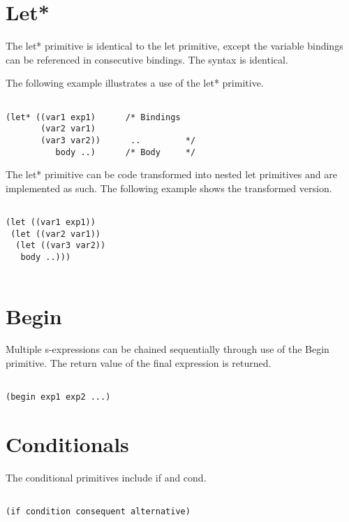 \documentclass{article}
\begin{document}
\section{Let*}

The let* primitive is identical to the let primitive, except the variable bindings can be referenced in consecutive bindings. The syntax is identical.

The following example illustrates a use of the let* primitive. 

\begin{verbatim}

(let* ((var1 exp1)      /* Bindings
       (var2 var1)     
       (var3 var2))      ..         */
          body ..)      /* Body     */   

\end{verbatim}

The let* primitive can be code transformed into nested let primitives and are implemented as such. The following example shows the transformed version.

\begin{verbatim}

(let ((var1 exp1))
 (let ((var2 var1))
  (let ((var3 var2))
   body ..))) 
 
\end{verbatim}

\section{Begin}

Multiple s-expressions can be chained sequentially through use of the Begin primitive. The return value of the final expression is returned. 

\begin{verbatim}

(begin exp1 exp2 ...) 

\end{verbatim}

\section{Conditionals}

The conditional primitives include if and cond.

\begin{verbatim}

(if condition consequent alternative)

\end{verbatim}
\end{document}
